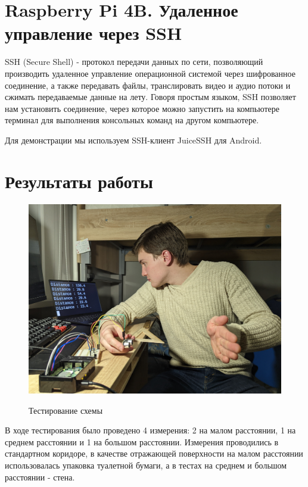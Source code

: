 \documentclass[a4paper, 14pt]{article}
\begin{document}
\section{Raspberry Pi 4B. Удаленное управление через SSH}

SSH (Secure Shell) - протокол передачи данных по сети, позволяющий производить удаленное управление операционной системой через шифрованное соединение, а также передавать файлы, транслировать видео и аудио потоки и сжимать передаваемые данные на лету. Говоря простым языком, SSH позволяет нам установить соединение, через которое можно запустить на компьютере терминал для выполнения консольных команд на другом компьютере.

Для демонстрации мы используем SSH-клиент JuiceSSH для Android.

\newpage
\section{Результаты работы}

\begin{figure}[H]
	\centering
	\includegraphics[width=15cm]{screenshots/12.png}\\
	\caption{Тестирование схемы}
\end{figure}

В ходе тестирования было проведено 4 измерения: 2 на малом расстоянии, 1 на среднем расстоянии и 1
на большом расстоянии. Измерения проводились в стандартном коридоре, в качестве отражающей поверхности на малом расстоянии использовалась упаковка туалетной бумаги, а в тестах на среднем
и большом расстоянии - стена.
\end{document}
